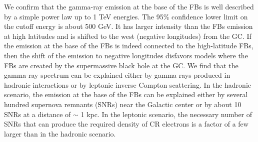 \documentclass[onecolumn, 12pt]{aa}
\begin{document}
{We confirm that the gamma-ray emission at the base of the FBs is well described by a simple power law up to 1 TeV energies.
The 95\% confidence lower limit on the cutoff energy is about 500 GeV.
It has larger intensity than the FBs emission at high latitudes and is shifted to the west (negative longitudes) from the GC.
If the emission at the base of the FBs is indeed connected to the high-latitude FBs, 
then the shift of the emission to negative longitudes disfavors models where the FBs are created by
the supermassive black hole at the GC.
We find that the gamma-ray spectrum can be explained either by gamma rays produced in hadronic interactions or by 
leptonic inverse Compton scattering.
In the hadronic scenario, the emission at the base of the FBs can be explained either by several hundred supernova remnants (SNRs) near the Galactic center
or by about 10 SNRs at a distance of $\sim$ 1 kpc.
In the leptonic scenario, the necessary number of SNRs that can produce the required density of CR electrons
is a factor of a few larger than in the hadronic scenario.
}
{}


\maketitle
   
   
\tableofcontents








\newpage
  

\begin{appendix}



%
\end{appendix}
\end{document}
